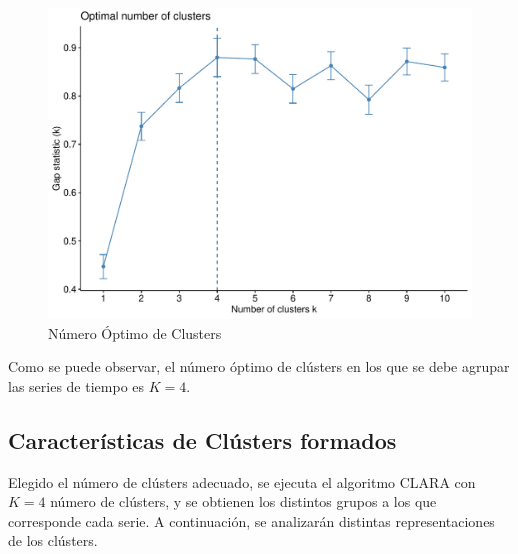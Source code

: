 \documentclass[12pt,oneside]{book}\usepackage[]{graphicx}\usepackage[]{color}
\theoremstyle{definition} %
\begin{document}
\begin{figure}[H]
\centering
\includegraphics[scale=0.65]{Resultados/4_k_optimo_clusters}
\caption{Número Óptimo de Clusters }\label{fig:k_opt}
\end{figure}

Como se puede observar, el número óptimo de clústers en los que se debe agrupar las series de tiempo es $K=4$.


\subsection{Características de Clústers formados}
Elegido el número de clústers adecuado, se ejecuta el algoritmo CLARA con $K=4$ número de clústers, y se obtienen los distintos grupos a los que corresponde cada serie. A continuación, se analizarán distintas representaciones de los clústers.
\end{document}
